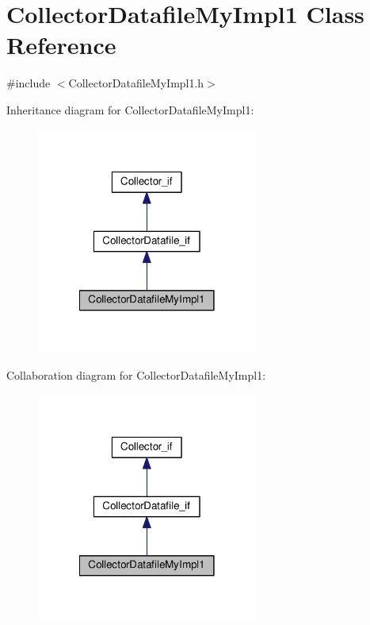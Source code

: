\hypertarget{class_collector_datafile_my_impl1}{\section{Collector\-Datafile\-My\-Impl1 Class Reference}
\label{class_collector_datafile_my_impl1}
}


{\ttfamily \#include $<$Collector\-Datafile\-My\-Impl1.\-h$>$}



Inheritance diagram for Collector\-Datafile\-My\-Impl1\-:
\nopagebreak
\begin{figure}[H]
\begin{center}
\leavevmode
\includegraphics[width=206pt]{class_collector_datafile_my_impl1__inherit__graph}
\end{center}
\end{figure}


Collaboration diagram for Collector\-Datafile\-My\-Impl1\-:
\nopagebreak
\begin{figure}[H]
\begin{center}
\leavevmode
\includegraphics[width=206pt]{class_collector_datafile_my_impl1__coll__graph}
\end{center}
\end{figure}

